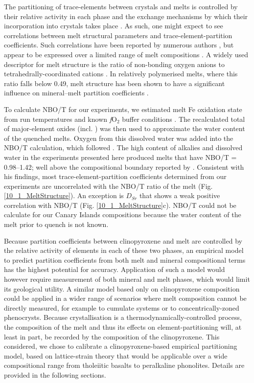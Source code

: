 \documentclass[review,authoryear,12pt]{elsarticle}
\newcommand{\fO}{\textit{f}O$_{2}$ }
\begin{document}
The partitioning of trace-elements between crystals and melts is controlled by their relative activity in each phase and the exchange mechanisms by which their incorporation into crystals takes place \citep[e.g., Jd-melt, Jd-DiHd and CaTS-DiHd exchanges have been shown to control REE incorporation in cpx, ][]{Putirka2008,Wood2014,Mollo2017}. As such, one might expect to see correlations between melt structural parameters and trace-element-partition coefficients. Such correlations have been reported by numerous authors \citep[e.g.,][]{Schmidt2006,Mollo2017}, but appear to be expressed over a limited range of melt compositions \citep{Gaetani2004,Huang2006}. A widely used descriptor for melt structure is the ratio of non-bonding oxygen anions to tetrahedrally-coordinated cations \citep[$\frac{NBO}{T}$,][]{Mysen1982,Mysen1985}. In relatively polymerised melts, where this ratio falls below 0.49, melt structure has been shown to have a significant influence on mineral--melt partition coefficients \citep{Gaetani2004,Huang2006}. 
    
    To calculate NBO/T for our experiments, we estimated melt Fe oxidation state from run temperatures and known \fO buffer conditions \citep{Kress1991}. The recalculated total of major-element oxides (incl. ) was then used to approximate the water content of the quenched melts. Oxygen from this dissolved water was added into the NBO/T calculation, which followed \citet{Mysen1985}. The high content of alkalies and dissolved water in the experiments presented here produced melts that have NBO/T = 0.98--1.42; well above the compositional boundary reported by \citet[][]{Gaetani2004}. 
Consistent with his findings, most trace-element-partition coefficients determined from our experiments are uncorrelated with the NBO/T ratio of the melt (Fig. \ref{10_1_MeltStructure}). An exception is $D_{Sr}$ that shows a weak positive correlation with NBO/T (Fig. \ref{10_1_MeltStructure}c). NBO/T could not be calculate for our Canary Islands compositions because the water content of the melt prior to quench is not known.

Because partition coefficients between clinopyroxene and melt are controlled by the relative activity of elements in each of these two phases, an empirical model to predict partition coefficients from both melt and mineral compositional terms has the highest potential for accuracy. Application of such a model would however require measurement of both mineral and melt phases, which would limit its geological utility. 
    A similar model based only on clinopyroxene composition could be applied in a wider range of scenarios where melt composition cannot be directly measured, for example to cumulate systems or to concentrically-zoned phenocrysts.
Because crystallisation is a thermodynamically-controlled process, the composition of the melt and thus its effects on element-partitioning will, at least in part, be recorded by the composition of the clinopyroxene. This considered, we chose to calibrate a clinopyroxene-based empirical partitioning model, based on lattice-strain theory that would be applicable over a wide compositional range from tholeiitic basalts to peralkaline phonolites. Details are provided in the following sections.  
\end{document}
